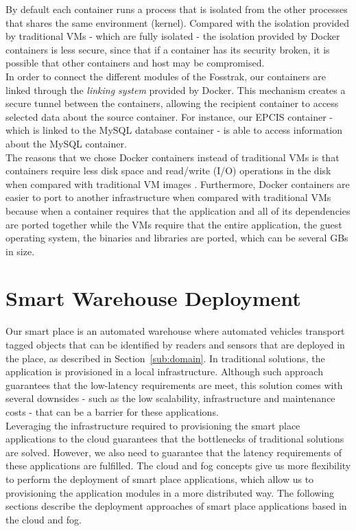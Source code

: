 By default each container runs a process that is isolated from the other processes that shares the same
environment (kernel). Compared with the isolation provided by traditional \glspl{VM} - which are fully
isolated - the isolation provided by Docker containers is less secure, since that if a container has
its security broken, it is possible that other containers and host may be compromised.\\

In order to connect the different modules of the Fosstrak, our containers are
linked through the \textit{linking system} provided by Docker. This mechanism creates a secure tunnel
between the containers, allowing the recipient container to access selected data about the source container.
For instance, our \gls{EPCIS} container - which is linked to the MySQL database container - is able to
access information about the MySQL container.\\

The reasons that we chose Docker containers instead of traditional \glspl{VM} is that containers
require less disk space and read/write (I/O) operations in the disk when compared with traditional
\gls{VM} images \cite{merkel2014docker}. Furthermore, Docker containers are easier to port to another
infrastructure when compared with traditional \glspl{VM} because when a container requires that the
application and all of its dependencies are ported together while the \glspl{VM} require that the
entire application, the guest operating system, the binaries and libraries are ported, which can be
several \glspl{GB} in size.

\section{Smart Warehouse Deployment}
\label{sec:sol_smart_warehouse_deployment}
Our smart place is an automated warehouse where automated vehicles transport tagged objects that can
be identified by readers and sensors that are deployed in the place, as described in Section~\ref{sub:domain}.
In traditional solutions, the application is provisioned in a local infrastructure. Although such
approach guarantees that the low-latency requirements are meet, this solution comes with several
downsides - such as the low scalability, infrastructure and maintenance costs - that can be a barrier
for these applications.\\

Leveraging the infrastructure required to provisioning the smart place applications to the cloud
guarantees that the bottlenecks of traditional solutions are solved. However, we also need to
guarantee that the latency requirements of these applications are fulfilled. The cloud and fog concepts
give us more flexibility to perform the deployment of smart place applications, which allow us to
provisioning the application modules in a more distributed way. The following sections describe
the deployment approaches of smart place applications based in the cloud and fog.

